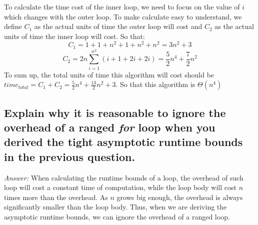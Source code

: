 \documentclass[11pt]{article}
\begin{document}
	To calculate the time cost of the inner loop, we need to focus on the value of $i$ which changes with the outer loop. To make calculate easy to understand, we define $C_1$ as the actual units of time the outer loop will cost and $C_2$ as the actual units of time the inner loop will cost. So that:
	\begin{equation*}
		C_1=1+1+n^2+1+n^2+n^2 = 3n^2+3
	\end{equation*}
	\begin{equation*}
		C_2=2n\sum_{i=1}^{n^2} (i+1+2i+2i)=\frac{5}{2} n^4 + \frac{7}{2} n^2
	\end{equation*}
	To sum up, the total units of time this algorithm will cost should be $time_{total} = C_1 + C_2 = \frac{5}{2}n^4+\frac{13}{2}n^2+3$. So that this algorithm is $\Theta(n^4)$
\subsection{Explain why it is reasonable to ignore the overhead of a ranged \emph{for} loop when you derived the tight asymptotic runtime bounds in the previous question.}
	\emph{Answer:} When calculating the runtime bounds of a loop, the overhead of such loop will cost a constant time of computation, while the loop body will cost $n$ times more than the overhead. As $n$ grows big enough, the overhead is always significantly smaller than the loop body. Thus, when we are deriving the asymptotic runtime bounds, we can ignore the overhead of a ranged loop.
\end{document}
